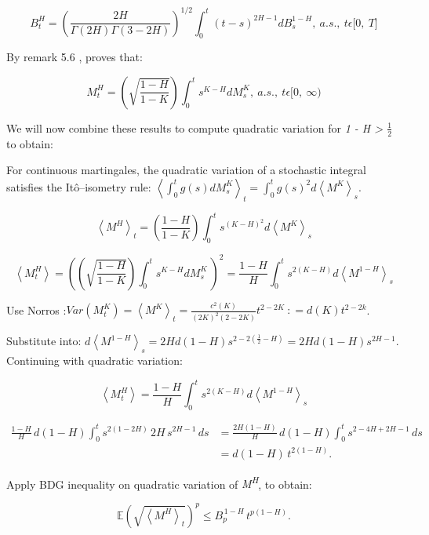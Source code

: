 \documentclass[12pt,a4paper]{report}
\numberwithin{equation}{section}
\begin{document}
\[B_{t}^{H} = {(\frac{2H}{\Gamma(2H)\Gamma(3 - 2H)})}^{1/2}\int_{0}^{t}{(t - s)}^{2H - 1}dB_{s}^{1 - H},\ a.s.,\ t\epsilon\lbrack 0,\ T\rbrack\]

By remark 5.6 \cite{jost2006transformation_108}, proves that:

\[M_{t}^{H} = (\sqrt{\frac{1 - H}{1 - K}})\int_{0}^{t}{s^{K - H}dM_{s\ }^{K},\ a.s.,\ t\epsilon\lbrack 0,\ \infty)}\]

We will now combine these results to compute quadratic variation for
\emph{1 - H \textgreater{} $\frac{1}{2}$} to obtain:

For continuous martingales, the quadratic variation of a stochastic
integral satisfies the Itô--isometry rule:
\(\left\langle \int_{0}^{t}{g(s)dM_{s}^{K}} \right\rangle_{t} = \int_{0}^{t}{g{(s)}^{2}d\left\langle M^{K} \right\rangle_{s}}\).

\[\left\langle M^{H} \right\rangle_{t} = (\frac{1 - H}{1 - K})\int_{0}^{t}{s^{{(K - H)}^{2}}d\left\langle M^{K} \right\rangle_{s}}\]

\[\left\langle M_{t}^{H} \right\rangle = \left( \left( \sqrt{\frac{1 - H}{1 - K}} \right)\int_{0}^{t}{s^{K - H}dM_{s\ }^{K}\ } \right)^{2} = \frac{1 - H}{H}\int_{0}^{t}{s^{2(K - H)}{d\left\langle M^{1 - H} \right\rangle}_{s}}\]

Use Norros \cite{norros1999elementary_112}
:\(Var\left( M_{t}^{K} \right) = \left\langle M^{K} \right\rangle_{t} = \frac{c^{2}(K)}{(2K)^{2}(2 - 2K)}t^{2 - 2K}\ : = d(K)t^{2 - 2k}\).

Substitute into:
\(d\left\langle M^{1 - H} \right\rangle_{s} = 2Hd(1 - H)s^{2 - 2\left( \frac{1}{2} - H \right)} = 2Hd(1 - H)s^{2H - 1}\).
Continuing with quadratic variation:

\[\left\langle M_{t}^{H} \right\rangle = \frac{1 - H}{H}\int_{0}^{t}{s^{2(K - H)}{d\left\langle M^{1 - H} \right\rangle}_{s}}\]

\begin{equation}\tag{5.1.39}\label{eq:5.1.39}
\begin{aligned}
\frac{1-H}{H}\,d(1-H)\int_{0}^{t}s^{2(1-2H)}\,2H\,s^{2H-1}\,ds
&= \frac{2H(1-H)}{H}\,d(1-H)\int_{0}^{t}s^{2-4H+2H-1}\,ds \\
&= d(1-H)\,t^{2(1-H)} .
\end{aligned}
\end{equation}


Apply BDG inequality on quadratic variation of
\emph{M\textsuperscript{H}}, to obtain:

\begin{equation}\tag{5.1.40}
\mathbb{E}\left(\sqrt{\left\langle M^{H}\right\rangle_{t}}\right)^{p}
\le B_{p}^{\,1-H}\,t^{p(1-H)}.
\end{equation}
\end{document}
